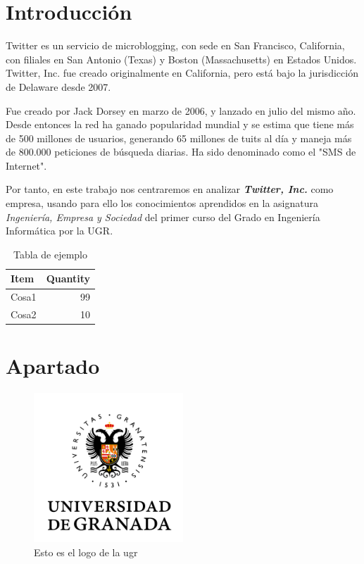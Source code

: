 \documentclass[12pt, spanish]{article}
\begin{document}

\tableofcontents
\pagebreak


\section{Introducción}

Twitter es un servicio de microblogging, con sede en San Francisco, California, con filiales en San Antonio (Texas) y Boston (Massachusetts) en Estados Unidos. Twitter, Inc. fue creado originalmente en California, pero está bajo la jurisdicción de Delaware desde 2007. 

Fue creado por Jack Dorsey en marzo de 2006, y lanzado en julio del mismo año. Desde entonces la red ha ganado popularidad mundial y se estima que tiene más de 500 millones de usuarios, generando 65 millones de tuits al día y maneja más de 800.000 peticiones de búsqueda diarias. Ha sido denominado como el "SMS de Internet".

Por tanto, en este trabajo nos centraremos en analizar \textbf{\textit{Twitter, Inc.}} como empresa, usando para ello los conocimientos aprendidos en la asignatura \textit{Ingeniería, Empresa y Sociedad} del primer curso del Grado en Ingeniería Informática por la UGR.

\begin{table}[!htb]
\centering
\begin{tabular}{l|r}
Item & Quantity \\\hline
Cosa1 & 99 \\
Cosa2 & 10
\end{tabular}
\caption{\label{tab:widgets}Tabla de ejemplo}
\end{table}

\newpage

\section{Apartado}

\begin{figure}[!htb]
\centering
\includegraphics[width=0.5\textwidth]{ugr.png}
\caption{\label{fig:frog}Esto es el logo de la ugr}
\end{figure}
\end{document}
